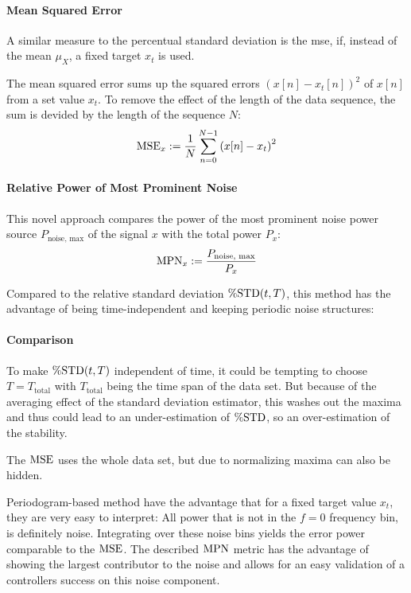 \paragraph{Mean Squared Error}
A similar measure to the percentual standard deviation is the \gls{mse}, if, instead of the mean $\mu_X$, a fixed target $x_t$ is used.

The mean squared error sums up the squared errors $\left(x[n] - x_t[n]\right)^2$ of $x[n]$ from a set value $x_t$. To remove the effect of the length of the data sequence, the sum is devided by the length of the sequence $N$:
\begin{equation}
\operatorname{MSE}_x := \frac{1}{N} \sum_{n=0}^{N-1} \left(x[n] - x_t\right)^2
\end{equation}

\paragraph{Relative Power of Most Prominent Noise}
This novel approach compares the power of the most prominent noise power source $P_\text{noise, max}$ of the signal $x$ with the total power $P_x$:
\begin{equation}\label{eq:mpn}
\operatorname{MPN}_x := \frac{P_\text{noise, max}}{P_x}
\end{equation}

Compared to the relative standard deviation $\operatorname{\%STD}(t,T)$, this method has the advantage of being time-independent and keeping periodic noise structures:\\

\paragraph{Comparison}
To make $\operatorname{\%STD}(t,T)$ independent of time, it could be tempting to choose $T=T_\text{total}$ with $T_\text{total}$ being the time span of the data set. But because of the averaging effect of the standard deviation estimator, this washes out the maxima and thus could lead to an under-estimation of $\operatorname{\%STD}$, so an over-estimation of the stability.

The $\operatorname{MSE}$ uses the whole data set, but due to normalizing maxima can also be hidden.

Periodogram-based method have the advantage that for a fixed target value $x_t$, they are very easy to interpret: All power that is not in the $f=0$ frequency bin, is definitely noise. Integrating over these noise bins yields the error power comparable to the $\operatorname{MSE}$.
The described $\operatorname{MPN}$ metric has the advantage of showing the largest contributor to the noise and allows for an easy validation of a controllers success on this noise component.

